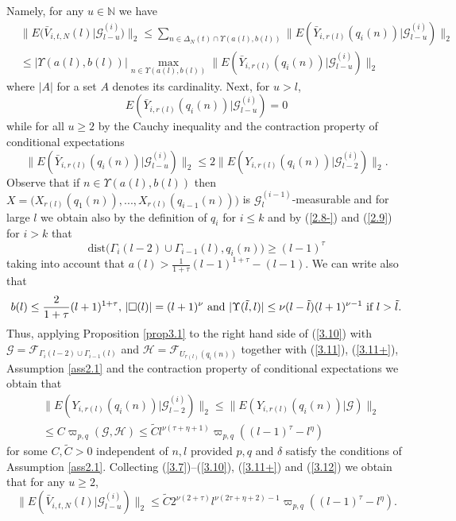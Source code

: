 Namely, for any $u\in{{\mathbb N}}$ we have
\begin{eqnarray}\label{3.8}
&\| E\big(\bar V_{i,t,N}(l)|{{\mathcal G}}^{(i)}_{l-u}\big)\|_2\leq\sum_{n\in{{\Delta}}_N(t)\cap
{{\Upsilon}}(a(l),b(l))}\| E(\bar Y_{i,r(l)}(q_i(n))|{{\mathcal G}}^{(i)}_{l-u})\|_2\\
&\leq |{{\Upsilon}}(a(l),b(l))|\max_{n\in{{\Upsilon}}(a(l),b(l))}\| E(\bar Y_{i,r(l)}(q_i(n))|
{{\mathcal G}}^{(i)}_{l-u})\|_2
\nonumber\end{eqnarray}
where $|A|$ for a set $A$ denotes its cardinality. Next, for $u>l$,
\begin{equation}\label{3.9}
E(\bar Y_{i,r(l)}(q_i(n))|{{\mathcal G}}^{(i)}_{l-u})=0
\end{equation}
while for all $u\geq 2$ by the Cauchy inequality and the
contraction property of conditional expectations 
\begin{equation}\label{3.10}
\| E(\bar Y_{i,r(l)}(q_i(n))|{{\mathcal G}}^{(i)}_{l-u})\|_2\leq 2\| E(Y_{i,r(l)}
(q_i(n))|{{\mathcal G}}^{(i)}_{l-2})\|_2.
\end{equation}
Observe that if $n\in{{\Upsilon}}(a(l),b(l))$ then $X=\big(X_{r(l)}(q_1(n)),...,
X_{r(l)}(q_{i-1}(n))\big)$ is ${{\mathcal G}}_l^{(i-1)}$-measurable and for large $l$
we obtain also by the definition of $q_i$ for $i\leq k$ and by (\ref{2.8-})
and (\ref{2.9}) for $i>k$ that
\begin{equation}\label{3.11}
\mbox{dist}\big({{\Gamma}}_i(l-2)\cup{{\Gamma}}_{i-1}(l),q_i(n)\big)\geq (l-1)^\tau
\end{equation}
taking into account that $a(l)>\frac 1{1+\tau}(l-1)^{1+\tau}-(l-1)$.
We can write also that
\begin{equation}\label{3.11+}
b(l)\leq\frac 2{1+\tau}(l+1)^{1+\tau},\, |{{\large\square}}(l)|=(l+1)^\nu\,\,\mbox{and}\,\,
|{{\Upsilon}}(\tilde l,l)|\leq\nu(l-\tilde l)(l+1)^{\nu-1}\,\,\mbox{if}\,\,   l>\tilde l.
\end{equation}
Thus, applying Proposition \ref{prop3.1} to the right hand side of 
(\ref{3.10}) with ${{\mathcal G}}={{\mathcal F}}_{{{\Gamma}}_i(l-2)\cup{{\Gamma}}_{i-1}(l)}$ and ${{\mathcal H}}=
{{\mathcal F}}_{U_{r(l)}(q_i(n))}$ together with (\ref{3.11}), (\ref{3.11+}),
Assumption \ref{ass2.1} and
the contraction property of conditional expectations we obtain that
\begin{eqnarray}\label{3.12}
&\| E(Y_{i,r(l)}(q_i(n))|{{\mathcal G}}^{(i)}_{l-2})\|_2\leq \| E(Y_{i,r(l)}(q_i(n))
|{{\mathcal G}})\|_2\\
&\leq C{{\varpi}}_{p,q}({{\mathcal G}},{{\mathcal H}})\leq\tilde Cl^{\nu(\tau+\eta+1)}{{\varpi}}_{p,q}
((l-1)^\tau-l^\eta)\nonumber
\end{eqnarray}
for some $C,\tilde C>0$ independent of $n,l$ provided $p,q$ and ${{\delta}}$ 
satisfy the conditions of Assumption \ref{ass2.1}. Collecting 
(\ref{3.7})--(\ref{3.10}), (\ref{3.11+}) and (\ref{3.12}) we obtain that 
for any $u\geq 2$,
\begin{equation}\label{3.13}
\| E(\bar V_{i,t,N}(l)|{{\mathcal G}}^{(i)}_{l-u})\|_2\leq\tilde C2^{\nu(2+\tau)}
l^{\nu(2\tau+\eta+2)-1}{{\varpi}}_{p,q}((l-1)^\tau-l^\eta).
\end{equation}

